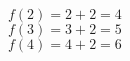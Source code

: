 \documentclass[varwidth,convert={density=2000,size=2000x,outext=.png}]{standalone}
\begin{document}
$f(2)=2+2=4$
\\
$f(3)=3+2=5$
\\
$f(4)=4+2=6$
\end{document}
